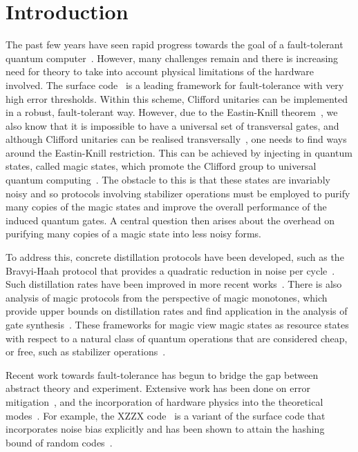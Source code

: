 \documentclass[pra,
aps,
twocolumn,
superscriptaddress,
groupedaddress,
nofootinbib,
reprint
]{revtex4-1}
\begin{document}
\section{Introduction}
\label{sec:intro}
The past few years have seen rapid progress towards the goal of a fault-tolerant quantum computer~\cite{Nickerson_2014, Nikahd_2017, chao_2018, lin_pieceable_2020, Lin_2020, Bourassa_2021}. However, many challenges remain and there is increasing need for theory to take into account physical limitations of the hardware involved. The surface code~\cite{Bravyi_1998, Freedman_2001, Dennis_2002, Raussendorf_2007} is a leading framework for fault-tolerance with very high error thresholds. Within this scheme, Clifford unitaries can be implemented in a robust, fault-tolerant way. However, due to the Eastin-Knill theorem~\cite{Eastin_2009}, we also know that it is impossible to have a universal set of transversal gates, and although Clifford unitaries can be realised transversally~\cite{Calderbank_1996, Steane_1996}, one needs to find ways around the Eastin-Knill restriction. This can be achieved by injecting in quantum states, called magic states, which promote the Clifford group to universal quantum computing~\cite{cit:bravyi}. The obstacle to this is that these states are invariably noisy and so protocols involving stabilizer operations must be employed to purify many copies of the magic states and improve the overall performance of the induced quantum gates. A central question then arises about the overhead on purifying many copies of a magic state into less noisy forms. 

To address this, concrete distillation protocols have been developed, such as the Bravyi-Haah protocol that provides a quadratic reduction in noise per cycle~\cite{Bravyi2012}. Such distillation rates have been improved in more recent works~\cite{Hastings2018, Litinski_2019, Krishna2019, cit:prakash}. There is also analysis of magic protocols from the perspective of magic monotones, which provide upper bounds on distillation rates and find application in the analysis of gate synthesis~\cite{Campbell_2017, Howard_2017, Prakash_2018}. These frameworks for magic view magic states as resource states with respect to a natural class of quantum operations that are considered cheap, or free, such as stabilizer operations~\cite{Gour_2019, cit:ahmadi, cit:seddon, Wang_2019}.
  
  
Recent work towards fault-tolerance has begun to bridge the gap between abstract theory and experiment. Extensive work has been done on error mitigation~\cite{Li_2017, Temme_2017, Endo_2018, McClean_2017}, and the incorporation of hardware physics into the theoretical modes~\cite{Kandala_2019, Colless_2018, song2018quantum, Bravyi_2021}. For example, the XZZX code~\cite{bonilla_ataides_xzzx_2021} is a variant of the surface code that incorporates noise bias explicitly and has been shown to attain the hashing bound of random codes~\cite{Bennett_1996}. 
\end{document}
